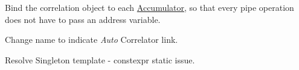 
\begin{DoxyRefList}
\item[\label{todo__todo000001}%
\Hypertarget{todo__todo000001}%
Class \hyperlink{classAccumulator}{Accumulator} ]Bind the correlation object to each \hyperlink{classAccumulator}{Accumulator}, so that every {\ttfamily pipe} operation does not have to pass an address variable.  
\item[\label{todo__todo000002}%
\Hypertarget{todo__todo000002}%
Member \hyperlink{classErrors_a8578169dc7b56d2080f07a0647f627e1}{Errors\+:\+:Auto\+\_\+\+Multi\+Tau\+\_\+\+Input\+\_\+\+Validator} ()]Change name to indicate {\itshape Auto} Correlator link.  
\item[\label{todo__todo000003}%
\Hypertarget{todo__todo000003}%
Class \hyperlink{classPIT__LifetimeTimer}{P\+I\+T\+\_\+\+Lifetime\+Timer} ]Resolve Singleton template -\/ constexpr static issue. 
\end{DoxyRefList}
